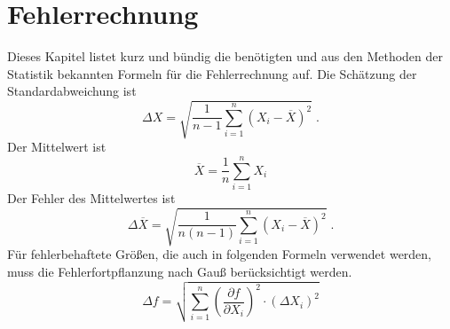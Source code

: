 \section{Fehlerrechnung}
Dieses Kapitel listet kurz und bündig die benötigten und aus den Methoden der Statistik bekannten Formeln für die Fehlerrechnung auf.
Die Schätzung der Standardabweichung ist
\begin{equation}
  \label{eq:std}
  \Delta X = \sqrt{\frac{1}{n-1}\sum_{i=1}^n(X_i-\overline{X})^2}     \; .
\end{equation}
Der Mittelwert ist
\begin{equation}
  \overline{X} = \frac{1}{n} \sum_{i=1}^nX_i
\end{equation}
Der Fehler des Mittelwertes ist
\begin{equation}
  \label{eq:std_mean}
  \Delta \overline{X} = \sqrt{\frac{1}{n(n-1)}\sum_{i=1}^n(X_i-\overline{X})^2}   \; .
\end{equation}
Für fehlerbehaftete Größen, die auch in folgenden Formeln verwendet werden, muss die Fehlerfortpflanzung nach Gauß berücksichtigt werden.
\begin{equation}
  \label{eq:GFFP}
  \Delta f = \sqrt{\sum_{i=1}^n \left(\frac{\partial f}{\partial X_i}\right)^2 \cdot (\Delta X_i)^2}
\end{equation}
